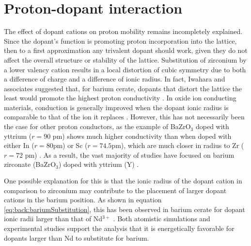 \vspace{12pt}
\section{Proton-dopant interaction}
The effect of dopant cations on proton mobility remains incompletely explained. Since the dopant's function is promoting proton incorporation into the lattice, then to a first approximation any trivalent dopant should work, given they do not affect the overall structure or stability of the lattice. Substitution of zirconium by a lower valency cation results in a local distortion of cubic symmetry due to both a difference of charge and a difference of ionic radius. In fact, Iwahara and associates suggested that, for barium cerate, dopants that distort the lattice the least would promote the highest proton conductivity \cite{IWAHARA1994}. In oxide ion conducting materials, conduction is generally improved when the dopant ionic radius is comparable to that of the ion it replaces \cite{Haile2003, Mogensen2004}. However, this has not necessarily been the case for other proton conductors, as the example of BaZrO$_3$ doped with yttrium ($r=90$ pm) shows much higher conductivity than when doped with either In ($r=80$pm) or Sc ($r=74.5$pm), which are much closer in radius to Zr ($r=72$ pm) \cite{Kreuer2004}. As a result, the vast majority of studies have focused on barium zirconate (BaZrO$_3$) doped with yttrium (Y) \cite{Fabbri2010a,Yamazaki2011,Tao2007,Sun2013,Hossain2017}. 

One possible explanation for this is that the ionic radius of the dopant cation in comparison to zirconium may contribute to the placement of larger dopant cations in the barium position. As shown in equation \ref{eq:back:bariumSubstitution}, this has been observed in barium cerate for dopant ionic radii larger than that of Nd$^{3+}$ \cite{Makovec1997}. Both atomistic simulations \cite{Davies1999, Wu2005} and experimental studies \cite{Wu2004} support the analysis that it is energetically favorable for dopants larger than Nd to substitute for barium. 

